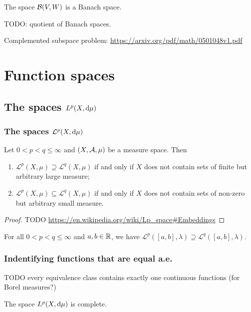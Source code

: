 The space $\operatorname{\mathcal{B}}(V,W)$ is a Banach space.

TODO: quotient of Banach spaces.

Complemented subspace problem: \url{https://arxiv.org/pdf/math/0501048v1.pdf}

\section{Function spaces}
\subsection{The spaces $L^p(X,\operatorname{d \!}{\mu})$}

\subsubsection{The spaces $\mathcal{L}^p(X,\operatorname{d \!}{\mu})$}
\begin{proposition}
Let $0< p<q \leq \infty$ and $\left( X,\mathcal{A},\mu \right)$ be a measure space. Then
\begin{enumerate}
\item $\mathcal{L}^p(X,\mu) \supseteq \mathcal{L}^q(X,\mu)$ \textup{if and only if} $X$ does not contain sets of finite but arbitrary large measure;
\item $\mathcal{L}^p(X,\mu) \subseteq \mathcal{L}^q(X,\mu)$ \textup{if and only if} $X$ does not contain sets of non-zero but arbitrary small measure.
\end{enumerate}
\end{proposition}
\begin{proof}
TODO \url{https://en.wikipedia.org/wiki/Lp_space#Embeddings}
\end{proof}
\begin{corollary}
For all $0< p<q \leq \infty$ and $a,b\in\mathbb{R}$, we have $\mathcal{L}^p([a,b],\lambda) \supseteq \mathcal{L}^q([a,b],\lambda)$.
\end{corollary}

\subsubsection{Indentifying functions that are equal a.e.}

\begin{proposition}
TODO every equivalence class contains exactly one continuous functions (for Borel measures?)
\end{proposition}

\begin{theorem}
The space $L^p(X,\operatorname{d \!}{\mu})$ is complete.
\end{theorem}


